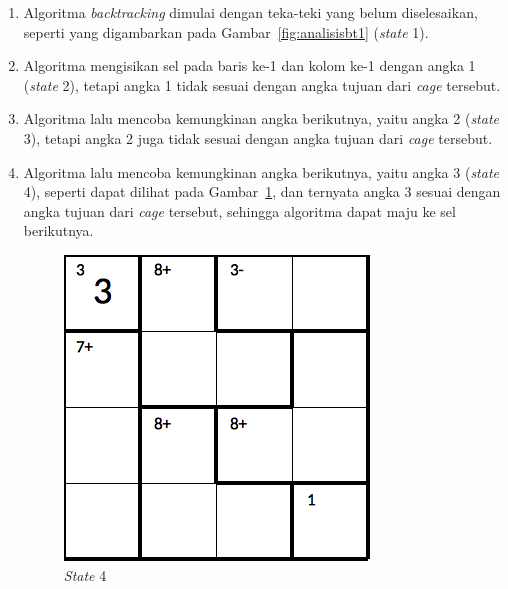 \begin{enumerate}
\item Algoritma \textit{backtracking} dimulai dengan teka-teki yang belum diselesaikan, seperti yang digambarkan pada Gambar~\ref{fig:analisisbt1} (\textit{state} 1).
\item Algoritma mengisikan sel pada baris ke-1 dan kolom ke-1 dengan angka 1 (\textit{state} 2), tetapi angka 1 tidak sesuai dengan angka tujuan dari \textit{cage} tersebut.
\item Algoritma lalu mencoba kemungkinan angka berikutnya, yaitu angka 2 (\textit{state} 3), tetapi angka 2 juga tidak sesuai dengan angka tujuan dari \textit{cage} tersebut.
\item Algoritma lalu mencoba kemungkinan angka berikutnya, yaitu angka 3 (\textit{state} 4), seperti dapat dilihat pada Gambar~\ref{fig:analisisbt2}, dan ternyata angka 3 sesuai dengan angka tujuan dari \textit{cage} tersebut, sehingga algoritma dapat maju ke sel berikutnya.

\begin{figure}
\centering
\captionsetup{justification=centering}
\includegraphics[scale=0.333]{Gambar/backtracking/State4}
\caption[\textit{State} 4]{\textit{State} 4}
\label{fig:analisisbt2}
\end{figure}


\end{enumerate}
